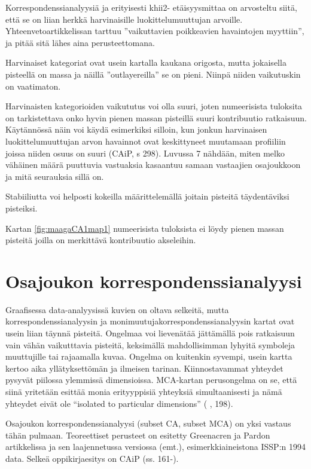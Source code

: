 \documentclass[
  finnish,
]{book}
\begin{document}
Korrespondenssianalyysiä ja erityisesti khii2- etäisyysmittaa on arvosteltu siitä,
että se on liian herkkä harvinaisille luokittelumuuttujan arvoille.
Yhteenvetoartikkelissan \citet{RefWorks:doc:5c768b09e4b02df9431e950a} tarttuu ''vaikuttavien
poikkeavien havaintojen myyttiin'', ja pitää sitä lähes aina perusteettomana.

Harvinaiset kategoriat ovat usein kartalla kaukana origosta, mutta jokaisella
pisteellä on massa ja näillä ''outlayereilla'' se on pieni. Niinpä niiden
vaikutuskin on vaatimaton.

Harvinaisten kategorioiden vaikututus voi olla suuri, joten numeerisista
tuloksita on tarkistettava onko hyvin pienen massan pisteillä suuri kontribuutio
ratkaisuun. Käytännössä näin voi käydä esimerkiksi silloin, kun jonkun
harvinaisen luokittelumuuttujan arvon havainnot ovat keskittyneet muutamaan
profiiliin joissa niiden osuus on suuri (CAiP, s 298). Luvussa 7 nähdään, miten
melko vähäinen määrä puuttuvia vastuaksia kasaantuu samaan vastaajien osajoukkoon
ja mitä seurauksia sillä on.

Stabiiliutta voi helposti kokeilla määrittelemällä joitain pisteitä täydentäviksi
pisteiksi.

Kartan \ref{fig:maagaCA1map1} numeerisista tuloksista ei löydy pienen massan pisteitä joilla
on merkittävä kontribuutio akseleihin.

\hypertarget{osajoukon-korrespondenssianalyysi}{%
\chapter{Osajoukon korrespondenssianalyysi}\label{osajoukon-korrespondenssianalyysi}}

Graafisessa data-analyysissä kuvien on oltava selkeitä, mutta
korrespondenssianalyysin ja monimuutujakorrespondenssianalyysin kartat ovat usein
liian täynnä pisteitä. Ongelmaa voi lievenätää jättämällä pois ratkaisuun vain
vähän vaikutttavia pisteitä, keksimällä mahdollisimman lyhyitä symboleja
muuttujille tai rajaamalla kuvaa. Ongelma on kuitenkin syvempi, usein kartta
kertoo aika yllätyksettömän ja ilmeisen tarinan. Kiinnostavammat yhteydet
pysyvät piilossa ylemmissä dimensioissa. MCA-kartan perusongelma on se, että
siinä yritetään esittää monia erityyppisiä yhteyksiä simultaanisesti ja nämä
yhteydet eivät ole ``isolated to particular dimensions''
( \citet{RefWorks:doc:5a857a44e4b0ed2d44664d87} , 198).

Osajoukon korrespondenssianalyysi (subset CA, subset MCA) on yksi vastaus tähän
pulmaan. Teoreettiset perusteet on esitetty Greenacren ja Pardon artikkelissa
\citep{RefWorks:doc:5a857a44e4b0ed2d44664d87} ja sen laajennetussa versiossa (emt.),
esimerkkiaineistona ISSP:n 1994 data. Selkeä oppikirjaesitys on CAiP (ss. 161-).
\end{document}
